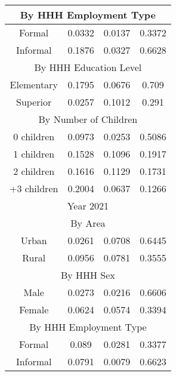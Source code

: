 \begin{table}[]
\begin{tabular}{@{}cccc@{}}
\multicolumn{4}{c}{By HHH Employment Type}                                  \\ \midrule
Formal      & 0.0332                  & 0.0137           & 0.3372           \\
Informal    & 0.1876                  & 0.0327           & 0.6628           \\ \midrule
\multicolumn{4}{c}{By HHH Education Level}                                  \\ \midrule
Elementary  & 0.1795                  & 0.0676           & 0.709            \\
Superior    & 0.0257                  & 0.1012           & 0.291            \\ \midrule
\multicolumn{4}{c}{By Number of Children}                                   \\ \midrule
0 children  & 0.0973                  & 0.0253           & 0.5086           \\
1 children  & 0.1528                  & 0.1096           & 0.1917           \\
2 children  & 0.1616                  & 0.1129           & 0.1731           \\
+3 children & 0.2004                  & 0.0637           & 0.1266           \\ \midrule
\multicolumn{4}{c}{Year 2021}                                               \\ \midrule
\multicolumn{4}{c}{By Area}                                                 \\ \midrule
Urban       & 0.0261                  & 0.0708           & 0.6445           \\
Rural       & 0.0956                  & 0.0781           & 0.3555           \\ \midrule
\multicolumn{4}{c}{By HHH Sex}                                              \\ \midrule
Male        & 0.0273                  & 0.0216           & 0.6606           \\
Female      & 0.0624                  & 0.0574           & 0.3394           \\ \midrule
\multicolumn{4}{c}{By HHH Employment Type}                                  \\ \midrule
Formal      & 0.089                   & 0.0281           & 0.3377           \\
Informal    & 0.0791                  & 0.0079           & 0.6623           \\ \midrule

\end{tabular}
\end{table}
